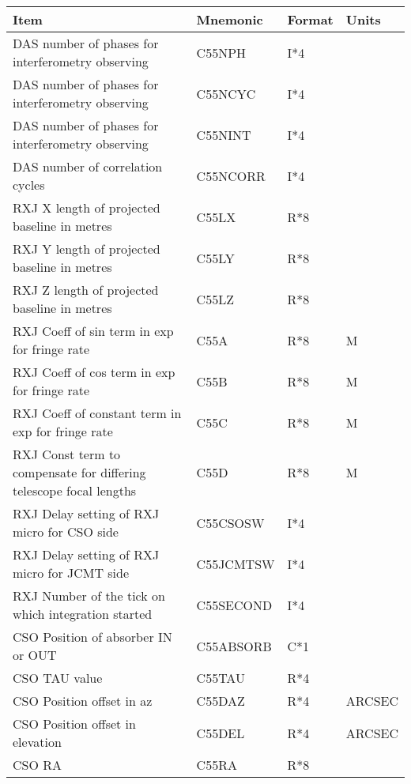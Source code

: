 \begin{tabular}{||l|l|l|l||} \hline
Item                                               & Mnemonic & Format & Units \\ \hline
DAS number of phases for interferometry observing  & C55NPH   & I*4    &  ~    \\      
DAS number of phases for interferometry observing  & C55NCYC  & I*4    &  ~    \\      
DAS number of phases for interferometry observing  & C55NINT  & I*4    &  ~    \\      
DAS number of correlation cycles                   & C55NCORR & I*4    &  ~    \\      
RXJ X length of projected baseline in metres       & C55LX     & R*8    &  ~    \\      
RXJ Y length of projected baseline in metres       & C55LY     & R*8    &  ~    \\      
RXJ Z length of projected baseline in metres       & C55LZ     & R*8    &  ~    \\      
RXJ Coeff of sin term in exp for fringe rate       & C55A      & R*8    &  M    \\      
RXJ Coeff of cos term in exp for fringe rate       & C55B      & R*8    &  M    \\      
RXJ Coeff of constant term in exp for fringe rate  & C55C      & R*8    &  M    \\      
RXJ Const term to compensate for differing telescope focal lengths  & C55D      & R*8    &  M    \\      
RXJ Delay setting of RXJ micro for CSO side        & C55CSOSW  & I*4    &  ~    \\      
RXJ Delay setting of RXJ micro for JCMT side       & C55JCMTSW & I*4    &  ~    \\      
RXJ Number of the tick on which integration started& C55SECOND & I*4    &  ~    \\      
CSO Position of absorber IN or OUT                 & C55ABSORB & C*1    &  ~    \\      
CSO TAU value                                      & C55TAU    & R*4    &  ~    \\      
CSO Position offset in az                          & C55DAZ    & R*4    &ARCSEC \\      
CSO Position offset in elevation                   & C55DEL    & R*4    &ARCSEC \\      
CSO RA                                             & C55RA     & R*8    &  ~    \\      

\end{tabular}
